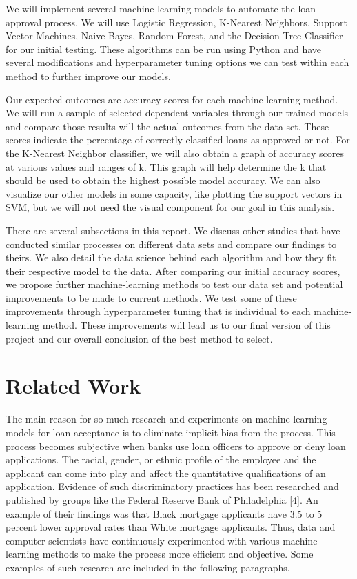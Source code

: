 \documentclass{article}
\begin{document}
We will implement several machine learning models to automate the loan approval process. We will use Logistic Regression, K-Nearest Neighbors, Support Vector Machines, Naive Bayes, Random Forest, and the Decision Tree Classifier for our initial testing. These algorithms can be run using Python and have several modifications and hyperparameter tuning options we can test within each method to further improve our models. 

Our expected outcomes are accuracy scores for each machine-learning method. We will run a sample of selected dependent variables through our trained models and compare those results will the actual outcomes from the data set. These scores indicate the percentage of correctly classified loans as approved or not. For the K-Nearest Neighbor classifier, we will also obtain a graph of accuracy scores at various values and ranges of k. This graph will help determine the k that should be used to obtain the highest possible model accuracy. We can also visualize our other models in some capacity, like plotting the support vectors in SVM, but we will not need the visual component for our goal in this analysis. 

There are several subsections in this report. We discuss other studies that have conducted similar processes on different data sets and compare our findings to theirs. We also detail the data science behind each algorithm and how they fit their respective model to the data. After comparing our initial accuracy scores, we propose further machine-learning methods to test our data set and potential improvements to be made to current methods. We test some of these improvements through hyperparameter tuning that is individual to each machine-learning method. These improvements will lead us to our final version of this project and our overall conclusion of the best method to select. 

\section{Related Work}

The main reason for so much research and experiments on machine learning models for loan acceptance is to eliminate implicit bias from the process. This process becomes subjective when banks use loan officers to approve or deny loan applications. The racial, gender, or ethnic profile of the employee and the applicant can come into play and affect the quantitative qualifications of an application. Evidence of such discriminatory practices has been researched and published by groups like the Federal Reserve Bank of Philadelphia [4]. An example of their findings was that Black mortgage applicants have 3.5 to 5 percent lower approval rates than White mortgage applicants. Thus, data and computer scientists have continuously experimented with various machine learning methods to make the process more efficient and objective. Some examples of such research are included in the following paragraphs.
\end{document}
